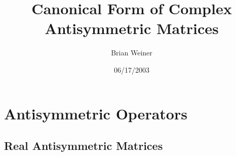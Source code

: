 \documentclass[aps,preprint]{revtex4}%
\begin{document}
\preprint{ }
\title[Canonical Form]{Canonical Form of Complex Antisymmetric Matrices}
\author{Brian Weiner}

\begin{abstract}


\end{abstract}
\date{06/17/2003}
\maketitle
\tableofcontents


\section{Antisymmetric Operators}

\subsection{Real Antisymmetric Matrices}
\end{document}
